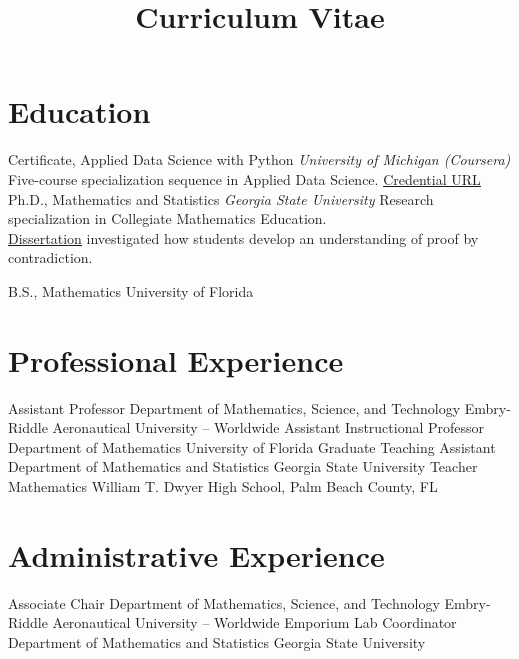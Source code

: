 \documentclass[10pt,a4paper,sans]{moderncv}
\title{Curriculum Vitae}
\begin{document}
\makecvtitle
\vspace*{-2cm}
\section{Education}
{Certificate, Applied Data Science with Python}
{}{}
{\textit{University of Michigan (Coursera)}}
{ Five-course specialization sequence in Applied Data Science. 
	\href{https://www.coursera.org/account/accomplishments/specialization/certificate/7TEVNZ89JDDA}{\underline{Credential URL}}  
}
{}
	{Ph.D., Mathematics and Statistics}
	{}{}
	{\textit{Georgia State University}}
	{ Research specialization in Collegiate Mathematics Education. \\ 
	\href{https://scholarworks.gsu.edu/math_diss/46/}{\underline{Dissertation}} investigated how students develop an understanding of proof by contradiction. 
	}
	{}
	
	{B.S., Mathematics}
	{University of Florida}
	{}{}{}
\section{Professional Experience}
	{Assistant Professor}
	{}
	{Department of Mathematics, Science, and Technology}
	{Embry-Riddle Aeronautical University -- Worldwide}
	{}
	{Assistant Instructional Professor}
	{}
	{Department of Mathematics}
	{University of Florida}
	{}
	{Graduate Teaching Assistant}
	{}
	{Department of Mathematics and Statistics}
	{Georgia State University}
	{}
	{Teacher}
	{}
	{Mathematics}
	{William T. Dwyer High School, Palm Beach County, FL}
	{} 
\section{Administrative Experience}
	{Associate Chair}
	{}
	{Department of Mathematics, Science, and Technology}
	{Embry-Riddle Aeronautical University -- Worldwide}
	{}
	{Emporium Lab Coordinator}
	{}
	{Department of Mathematics and Statistics}
	{Georgia State University}
	{}
\end{document}
